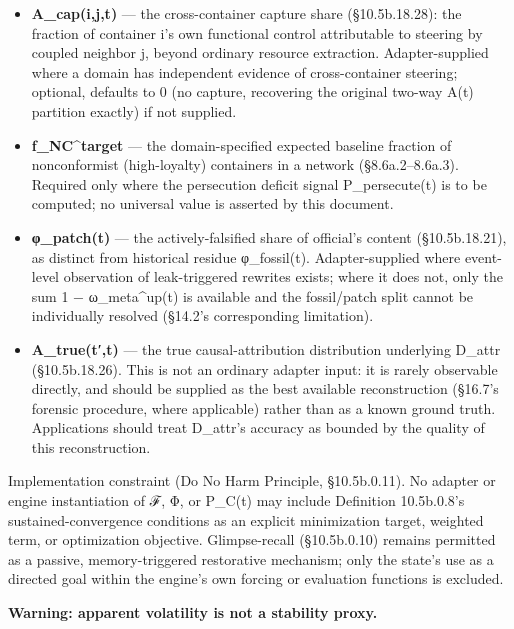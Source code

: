 \documentclass[
]{article}
\begin{document}
\begin{itemize}
{  dissent-channel content analysis; in a biological system,
  checkpoint-signal expression);} defaults to the trailing-slope proxy
  of Definition 10.5b.18.12 if not supplied, which itself requires
  κ\_loyal and w\_loyal (below).
\item
  \textbf{A\_cap(i,j,t)} --- the cross-container capture share
  (§10.5b.18.28): the fraction of container i's own functional control
  attributable to steering by coupled neighbor j, beyond ordinary
  resource extraction. Adapter-supplied where a domain has independent
  evidence of cross-container steering; optional, defaults to 0 (no
  capture, recovering the original two-way A(t) partition exactly) if
  not supplied.
\item
  \textbf{f\_NC\^{}target} --- the domain-specified expected baseline
  fraction of nonconformist (high-loyalty) containers in a network
  (§8.6a.2--8.6a.3). Required only where the persecution deficit signal
  P\_persecute(t) is to be computed; no universal value is asserted by
  this document.
\item
  \textbf{φ\_patch(t)} --- the actively-falsified share of official's
  content (§10.5b.18.21), as distinct from historical residue
  φ\_fossil(t). Adapter-supplied where event-level observation of
  leak-triggered rewrites exists; where it does not, only the sum 1 −
  ω\_meta\^{}up(t) is available and the fossil/patch split cannot be
  individually resolved (§14.2's corresponding limitation).
\item
  \textbf{A\_true(t′,t)} --- the true causal-attribution distribution
  underlying D\_attr (§10.5b.18.26). This is not an ordinary adapter
  input: it is rarely observable directly, and should be supplied as the
  best available reconstruction (§16.7's forensic procedure, where
  applicable) rather than as a known ground truth. Applications should
  treat D\_attr's accuracy as bounded by the quality of this
  reconstruction.
\end{itemize}

Implementation constraint (Do No Harm Principle, §10.5b.0.11). No
adapter or engine instantiation of ℱ, Φ, or P\_C(t) may include
Definition 10.5b.0.8's sustained-convergence conditions as an explicit
minimization target, weighted term, or optimization objective.
Glimpse-recall (§10.5b.0.10) remains permitted as a passive,
memory-triggered restorative mechanism; only the state's use as a
directed goal within the engine's own forcing or evaluation functions is
excluded.

\textbf{Warning: apparent volatility is not a stability proxy.}
\end{document}
